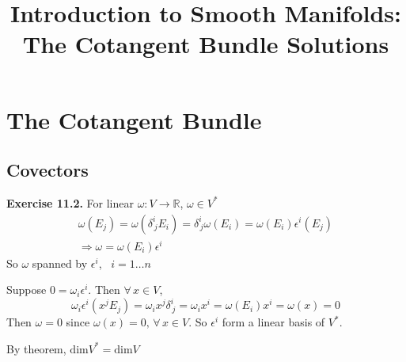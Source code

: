 \documentclass[11pt]{amsart}
\title{Introduction to Smooth Manifolds: The Cotangent Bundle Solutions}
\theoremstyle{definition}
\newcommand{\exercisehead}[1]{\medskip\noindent\textbf{Exercise #1.} }
\begin{document}
\maketitle
\section{The Cotangent Bundle}

\subsection*{Covectors}

\exercisehead{11.2} For linear $\omega : V \to \mathbb{R}$, $\omega \in V^*$
\[
\begin{gathered}
\omega(E_j) = \omega( \delta^i_{ \, j} E_i) = \delta^i_{ \, j } \omega(E_i) = \omega(E_i) \epsilon^i(E_j) \\
\Longrightarrow \omega = \omega(E_i)\epsilon^i
\end{gathered}
\]
So $\omega$ spanned by $\epsilon^i$, \, $i = 1 \dots n$

Suppose $0 = \omega_i \epsilon^i$.  Then $\forall \, x \in V$, \[
\omega_i \epsilon^i(x^j E_j) = \omega_i x^j \delta^i_{ \, j } = \omega_i x^i = \omega(E_i) x^i = \omega(x) = 0
\]
Then $\omega=0$ since $\omega(x) =0, \, \forall\, x \in V$.  So $\epsilon^i$ form a linear basis of $V^*$.

By theorem, $\text{dim}{ V^*} = \text{dim}{V}$
\end{document}
